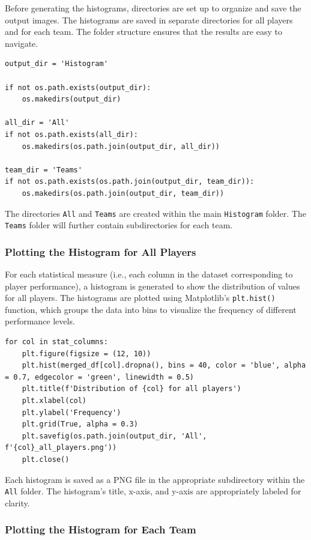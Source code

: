 \documentclass[a4paper,12pt]{article}
\begin{document}
Before generating the histograms, directories are set up to organize and save the output images. The histograms are saved in separate directories for all players and for each team. The folder structure ensures that the results are easy to navigate.

\begin{verbatim}
output_dir = 'Histogram'

if not os.path.exists(output_dir):
    os.makedirs(output_dir)

all_dir = 'All'
if not os.path.exists(all_dir):
    os.makedirs(os.path.join(output_dir, all_dir))

team_dir = 'Teams'
if not os.path.exists(os.path.join(output_dir, team_dir)):
    os.makedirs(os.path.join(output_dir, team_dir))
\end{verbatim}

The directories \texttt{All} and \texttt{Teams} are created within the main \texttt{Histogram} folder. The \texttt{Teams} folder will further contain subdirectories for each team.

\subsubsection{Plotting the Histogram for All Players}

For each statistical measure (i.e., each column in the dataset corresponding to player performance), a histogram is generated to show the distribution of values for all players. The histograms are plotted using Matplotlib's \texttt{plt.hist()} function, which groups the data into bins to visualize the frequency of different performance levels.

\begin{verbatim}
for col in stat_columns:
    plt.figure(figsize = (12, 10))
    plt.hist(merged_df[col].dropna(), bins = 40, color = 'blue', alpha = 0.7, edgecolor = 'green', linewidth = 0.5)
    plt.title(f'Distribution of {col} for all players')
    plt.xlabel(col)
    plt.ylabel('Frequency')
    plt.grid(True, alpha = 0.3)
    plt.savefig(os.path.join(output_dir, 'All', f'{col}_all_players.png'))
    plt.close()
\end{verbatim}

Each histogram is saved as a PNG file in the appropriate subdirectory within the \texttt{All} folder. The histogram's title, x-axis, and y-axis are appropriately labeled for clarity.

\subsubsection{Plotting the Histogram for Each Team}
\end{document}
